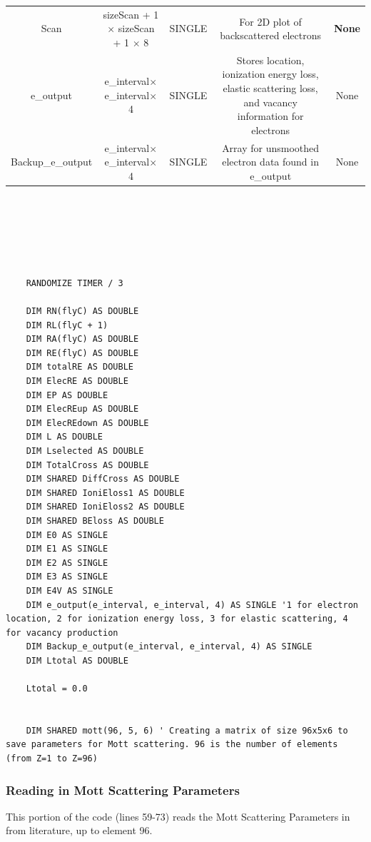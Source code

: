 \documentclass[10pt, reqno]{exam}
\begin{document}
\begin{table}[h]
\begin{tabular}{|c|c|c|c|c|}
        Scan & sizeScan + 1 $\times$ sizeScan + 1 $\times$ 8 & SINGLE & For 2D plot of backscattered electrons & \textbf{None} \\
        e\_output & e\_interval$\times$ e\_interval$\times$ 4  &  SINGLE  & Stores location, ionization energy loss, elastic scattering loss, and vacancy information for electrons & None   \\
        Backup\_e\_output & e\_interval$\times$ e\_interval$\times$ 4 & SINGLE & Array for unsmoothed electron data found in e\_output & None \\
        \hline
    \end{tabular}
    \label{tbl:arrays} \\
\end{table}
{
\begin{verbatim}




    RANDOMIZE TIMER / 3
    
    DIM RN(flyC) AS DOUBLE
    DIM RL(flyC + 1)
    DIM RA(flyC) AS DOUBLE
    DIM RE(flyC) AS DOUBLE
    DIM totalRE AS DOUBLE
    DIM ElecRE AS DOUBLE
    DIM EP AS DOUBLE
    DIM ElecREup AS DOUBLE
    DIM ElecREdown AS DOUBLE
    DIM L AS DOUBLE
    DIM Lselected AS DOUBLE
    DIM TotalCross AS DOUBLE
    DIM SHARED DiffCross AS DOUBLE
    DIM SHARED IoniEloss1 AS DOUBLE
    DIM SHARED IoniEloss2 AS DOUBLE
    DIM SHARED BEloss AS DOUBLE
    DIM E0 AS SINGLE
    DIM E1 AS SINGLE
    DIM E2 AS SINGLE
    DIM E3 AS SINGLE
    DIM E4V AS SINGLE
    DIM e_output(e_interval, e_interval, 4) AS SINGLE '1 for electron location, 2 for ionization energy loss, 3 for elastic scattering, 4 for vacancy production
    DIM Backup_e_output(e_interval, e_interval, 4) AS SINGLE
    DIM Ltotal AS DOUBLE
    
    Ltotal = 0.0
    
    
    DIM SHARED mott(96, 5, 6) ' Creating a matrix of size 96x5x6 to save parameters for Mott scattering. 96 is the number of elements (from Z=1 to Z=96) 
\end{verbatim}
\subsubsection{Reading in Mott Scattering Parameters}

This portion of the code (lines 59-73) reads the Mott Scattering Parameters in from literature, up to element 96. \par

}
\end{document}
